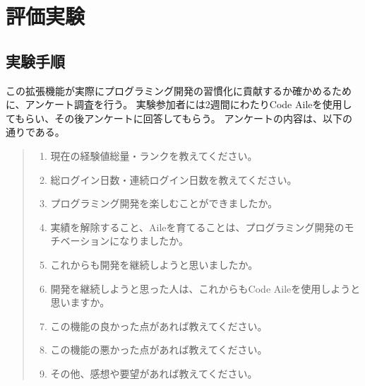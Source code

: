 \documentclass[12pt,twoside]{jbook}
\begin{document}



\chapter{評価実験}

\section{実験手順}
 この拡張機能が実際にプログラミング開発の習慣化に貢献するか確かめるために、アンケート調査を行う。
実験参加者には2週間にわたりCode Aileを使用してもらい、その後アンケートに回答してもらう。
アンケートの内容は、以下の通りである。
\begin{quote}
	\begin{enumerate}
    \item 現在の経験値総量・ランクを教えてください。
    \item 総ログイン日数・連続ログイン日数を教えてください。
    \item プログラミング開発を楽しむことができましたか。
    \item 実績を解除すること、Aileを育てることは、プログラミング開発のモチベーションになりましたか。
    \item これからも開発を継続しようと思いましたか。
    \item 開発を継続しようと思った人は、これからもCode Aileを使用しようと思いますか。
    \item この機能の良かった点があれば教えてください。
    \item この機能の悪かった点があれば教えてください。
    \item その他、感想や要望があれば教えてください。
	\end{enumerate}
\end{quote}
\end{document}

